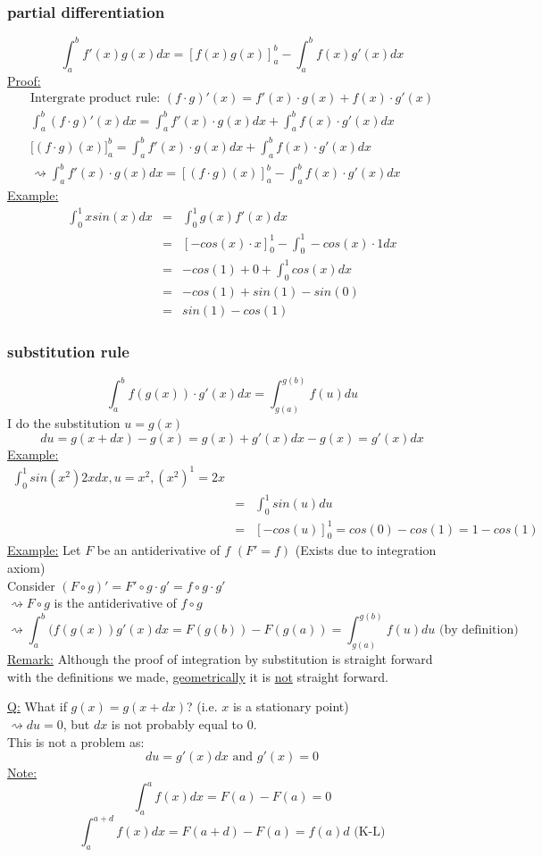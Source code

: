\documentclass[a4paper, 12pt]{article}
\begin{document}
\subsubsection{partial differentiation} $$\int_{a}^{b} f'(x)g(x) dx = [f(x)g(x)]_{a}^{b} - \int_{a}^{b} f(x)g'(x) dx$$ \underline{Proof:}
\begin{eqnarray*}
\text{Intergrate product rule: } (f\cdot g)'(x) = f'(x) \cdot g(x) + f(x) \cdot g'(x)\\
\int^{b}_{a}(f\cdot g)'(x)dx = \int^{b}_{a}f'(x) \cdot g(x) dx + \int^{b}_{a}f(x) \cdot g'(x) dx\\
\big[ (f\cdot g)(x)\big]^{b}_{a} = \int^{b}_{a}f'(x) \cdot g(x) dx + \int^{b}_{a}f(x) \cdot g'(x) dx\\
\rightsquigarrow \int^{b}_{a}f'(x) \cdot g(x) dx = [(f\cdot g)(x)]^{b}_{a} - \int^{b}_{a}f(x) \cdot g'(x) dx
\end{eqnarray*} \underline{Example:}
\begin{eqnarray*}
\int^{1}_{0} x sin(x) dx &=& \int^{1}_{0} g(x) f'(x) dx\\
&=& [-cos(x) \cdot x]^{1}_{0} - \int^{1}_{0} -cos(x) \cdot 1 dx\\
&=& -cos(1) + 0 + \int^{1}_{0} cos(x) dx\\
&=& -cos(1) + sin(1) - sin(0)\\
&=& sin(1) - cos(1)
\end{eqnarray*}
\subsubsection{substitution rule} $$\int_{a}^{b} f(g(x)) \cdot g'(x) dx = \int_{g(a)}^{g(b)} f(u)du$$ 
I do the substitution $u = g(x)$
$$du = g(x+dx) - g(x) = g(x) + g'(x)dx - g(x) = g'(x)dx$$
\underline{Example:}
\begin{eqnarray*}
\int_{0}^{1} sin(x^2) 2x dx, u=x^2, (x^2)^1 = 2x\\
&=& \int_{0}^{1} sin(u)du\\
&=& [-cos(u)]_{0}^{1} = cos(0) - cos(1) = 1 - cos(1)
\end{eqnarray*}
\underline{Example:}
Let $F$ be an antiderivative of $f$ $(F' = f)$ (Exists due to integration axiom)\\
Consider  $(F \circ g)' = F'\circ g\cdot g' = f \circ g \cdot g'$\\
$\rightsquigarrow F\circ g$ is the antiderivative of $f \circ g$
$$\rightsquigarrow\int^{b}_{a}(f(g(x))g'(x)dx = F(g(b)) - F(g(a)) = \int^{g(b)}_{g(a)} f(u) du \text{ (by definition)}$$
\underline{Remark:} Although the proof of integration by substitution is straight forward with the definitions we made, \underline{geometrically} it is \underline{not} straight forward.\\
\begin{tikzpicture}
\end{tikzpicture}
\underline{Q:} What if $g(x) = g(x+dx)$? (i.e. $x$ is a stationary point)\\
$\rightsquigarrow du=0$, but $dx$ is not probably equal to $0$.\\
This is not a problem as:$$du = g'(x)dx \text{ and } g'(x) = 0$$
\underline{Note:}
$$ \int^{a}_{a} f(x) dx = F(a) - F(a) = 0$$
$$ \int^{a+d}_{a} f(x) dx = F(a+d) - F(a) = f(a)d \text{ (K-L)}$$
\end{document}
